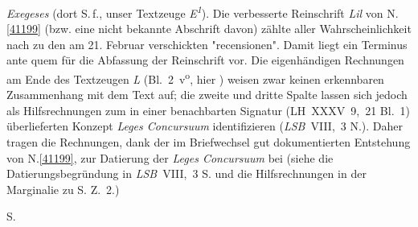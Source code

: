 \begin{ledgroup}
\cite{02000}\textit{Exegeses} (dort S.\,f., unser Textzeuge \textit{E\textsuperscript{1}}).
Die verbesserte Reinschrift \textit{Lil} von N.\;\ref{41199} (bzw. eine nicht bekannte Abschrift davon)
zählte aller Wahrscheinlichkeit nach zu den am 21. Februar verschickten "recensionen". Damit liegt ein Terminus ante quem für die Abfassung der Reinschrift vor.
\pend
\pstart
Die eigenhändigen Rechnungen am Ende des Textzeugen \textit{L} (Bl.~2~v\textsuperscript{o}, hier ) 
weisen zwar keinen erkennbaren Zusammenhang mit dem Text auf;
die zweite und dritte Spalte lassen sich jedoch als Hilfsrechnungen zum in einer benachbarten Signatur (LH~XXXV~9,~21 Bl.~1) überlieferten Konzept \cite{01383}\textit{Leges Concursuum} identifizieren (\textit{LSB}~VIII,~3 N.). 
Daher tragen die Rechnungen, dank der im Briefwechsel gut dokumentierten Entstehung von N.\;\ref{41199},
zur Datierung der \textit{Leges Concursuum} bei
(siehe die Datierungsbegründung in \textit{LSB}~VIII,~3 S. und die Hilfsrechnungen in der Marginalie zu S. Z.~2.)
\pend 
\end{ledgroup}
\vspace{8mm}
\pstart
\centering
{}%
%
\lbrack S.\rbrack
\hfill
{}
